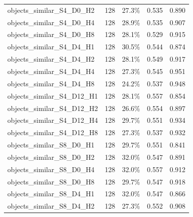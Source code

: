 \documentclass[11pt]{article}
\begin{document}
\begin{longtable}{p{}rrrr}
objects\_\allowbreak{}similar\_\allowbreak{}S4\_\allowbreak{}D0\_\allowbreak{}H2 & 128 & 27.3\% & 0.535 & 0.890\\
objects\_\allowbreak{}similar\_\allowbreak{}S4\_\allowbreak{}D0\_\allowbreak{}H4 & 128 & 28.9\% & 0.535 & 0.907\\
objects\_\allowbreak{}similar\_\allowbreak{}S4\_\allowbreak{}D0\_\allowbreak{}H8 & 128 & 28.1\% & 0.529 & 0.915\\
objects\_\allowbreak{}similar\_\allowbreak{}S4\_\allowbreak{}D4\_\allowbreak{}H1 & 128 & 30.5\% & 0.544 & 0.874\\
objects\_\allowbreak{}similar\_\allowbreak{}S4\_\allowbreak{}D4\_\allowbreak{}H2 & 128 & 28.1\% & 0.549 & 0.917\\
objects\_\allowbreak{}similar\_\allowbreak{}S4\_\allowbreak{}D4\_\allowbreak{}H4 & 128 & 27.3\% & 0.545 & 0.951\\
objects\_\allowbreak{}similar\_\allowbreak{}S4\_\allowbreak{}D4\_\allowbreak{}H8 & 128 & 24.2\% & 0.537 & 0.948\\
objects\_\allowbreak{}similar\_\allowbreak{}S4\_\allowbreak{}D12\_\allowbreak{}H1 & 128 & 28.1\% & 0.557 & 0.854\\
objects\_\allowbreak{}similar\_\allowbreak{}S4\_\allowbreak{}D12\_\allowbreak{}H2 & 128 & 26.6\% & 0.554 & 0.897\\
objects\_\allowbreak{}similar\_\allowbreak{}S4\_\allowbreak{}D12\_\allowbreak{}H4 & 128 & 29.7\% & 0.551 & 0.934\\
objects\_\allowbreak{}similar\_\allowbreak{}S4\_\allowbreak{}D12\_\allowbreak{}H8 & 128 & 27.3\% & 0.537 & 0.932\\
objects\_\allowbreak{}similar\_\allowbreak{}S8\_\allowbreak{}D0\_\allowbreak{}H1 & 128 & 29.7\% & 0.551 & 0.841\\
objects\_\allowbreak{}similar\_\allowbreak{}S8\_\allowbreak{}D0\_\allowbreak{}H2 & 128 & 32.0\% & 0.547 & 0.891\\
objects\_\allowbreak{}similar\_\allowbreak{}S8\_\allowbreak{}D0\_\allowbreak{}H4 & 128 & 32.0\% & 0.557 & 0.912\\
objects\_\allowbreak{}similar\_\allowbreak{}S8\_\allowbreak{}D0\_\allowbreak{}H8 & 128 & 29.7\% & 0.547 & 0.918\\
objects\_\allowbreak{}similar\_\allowbreak{}S8\_\allowbreak{}D4\_\allowbreak{}H1 & 128 & 32.0\% & 0.547 & 0.866\\
objects\_\allowbreak{}similar\_\allowbreak{}S8\_\allowbreak{}D4\_\allowbreak{}H2 & 128 & 27.3\% & 0.552 & 0.908\\

\end{longtable}
\end{document}
